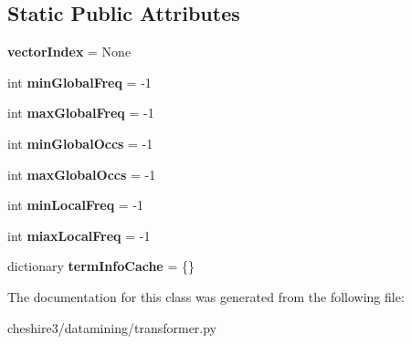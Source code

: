 \subsection*{Static Public Attributes}
\begin{DoxyCompactItemize}
\item 
\hypertarget{classcheshire3_1_1datamining_1_1transformer_1_1_arm_vector_transformer_a50a1cfd05d7fbb60fd981274e17494e3}{{\bfseries vector\-Index} = None}\label{classcheshire3_1_1datamining_1_1transformer_1_1_arm_vector_transformer_a50a1cfd05d7fbb60fd981274e17494e3}

\item 
\hypertarget{classcheshire3_1_1datamining_1_1transformer_1_1_arm_vector_transformer_a8c810c13701d689b46cabf702d3614a4}{int {\bfseries min\-Global\-Freq} = -\/1}\label{classcheshire3_1_1datamining_1_1transformer_1_1_arm_vector_transformer_a8c810c13701d689b46cabf702d3614a4}

\item 
\hypertarget{classcheshire3_1_1datamining_1_1transformer_1_1_arm_vector_transformer_a45f6fc0f3cd48689f36fff6c7ade2a88}{int {\bfseries max\-Global\-Freq} = -\/1}\label{classcheshire3_1_1datamining_1_1transformer_1_1_arm_vector_transformer_a45f6fc0f3cd48689f36fff6c7ade2a88}

\item 
\hypertarget{classcheshire3_1_1datamining_1_1transformer_1_1_arm_vector_transformer_a77c329a4aa553357d040a0dbc8375fce}{int {\bfseries min\-Global\-Occs} = -\/1}\label{classcheshire3_1_1datamining_1_1transformer_1_1_arm_vector_transformer_a77c329a4aa553357d040a0dbc8375fce}

\item 
\hypertarget{classcheshire3_1_1datamining_1_1transformer_1_1_arm_vector_transformer_a1afc689f367cbeccb7d5b45dc01102f6}{int {\bfseries max\-Global\-Occs} = -\/1}\label{classcheshire3_1_1datamining_1_1transformer_1_1_arm_vector_transformer_a1afc689f367cbeccb7d5b45dc01102f6}

\item 
\hypertarget{classcheshire3_1_1datamining_1_1transformer_1_1_arm_vector_transformer_adbd444160f7d8f10eb674b8661b46056}{int {\bfseries min\-Local\-Freq} = -\/1}\label{classcheshire3_1_1datamining_1_1transformer_1_1_arm_vector_transformer_adbd444160f7d8f10eb674b8661b46056}

\item 
\hypertarget{classcheshire3_1_1datamining_1_1transformer_1_1_arm_vector_transformer_aa94ba1864a3fb18586cae16b7a98510f}{int {\bfseries miax\-Local\-Freq} = -\/1}\label{classcheshire3_1_1datamining_1_1transformer_1_1_arm_vector_transformer_aa94ba1864a3fb18586cae16b7a98510f}

\item 
\hypertarget{classcheshire3_1_1datamining_1_1transformer_1_1_arm_vector_transformer_a698d4c9970d5383c1d113171f5a5817c}{dictionary {\bfseries term\-Info\-Cache} = \{\}}\label{classcheshire3_1_1datamining_1_1transformer_1_1_arm_vector_transformer_a698d4c9970d5383c1d113171f5a5817c}

\end{DoxyCompactItemize}


The documentation for this class was generated from the following file\-:\begin{DoxyCompactItemize}
\item 
cheshire3/datamining/transformer.\-py\end{DoxyCompactItemize}
